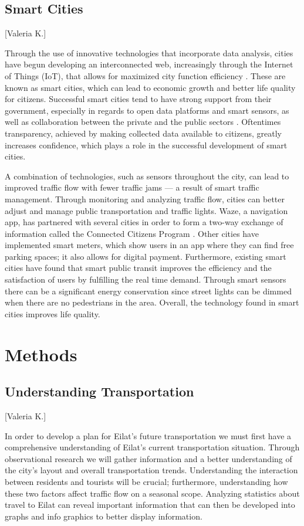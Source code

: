 \documentclass[12pt]{article}                         %
\begin{document}
\subsection{Smart Cities}[Valeria K.]

Through the use of innovative technologies that incorporate data analysis, cities have begun developing an interconnected web, increasingly through the Internet of Things (IoT), that allows for maximized city function efficiency \cite{MargaretRouseSmartCity}. These are known as smart cities, which can lead to economic growth and better life quality for citizens. Successful smart cities tend to have strong support from their government, especially in regards to open data platforms and smart sensors, as well as collaboration between the private and the public sectors \cite{BrianZanghi2017WhyExamples}. Oftentimes transparency, achieved by making collected data available to citizens, greatly increases confidence, which plays a role in the successful development of smart cities.

A combination of technologies, such as sensors throughout the city, can lead to improved traffic flow with fewer traffic jams --- a result of smart traffic management. Through monitoring and analyzing traffic flow, cities can better adjust and manage public transportation and traffic lights. Waze, a navigation app, has partnered with several cities in order to form a two-way exchange of information called the Connected Citizens Program \cite{Stern2016WazeMobility}. Other cities have implemented smart meters, which show users in an app where they can find free parking spaces; it also allows for digital payment. Furthermore, existing smart cities have found that smart public transit improves the efficiency and the satisfaction of users by fulfilling the real time demand. Through smart sensors there can be a significant energy conservation since street lights can be dimmed when there are no pedestrians in the area. Overall, the technology found in smart cities improves life quality.

\newpage
\section{Methods}

\subsection{Understanding Transportation}[Valeria K.]

In order to develop a plan for Eilat's future transportation we must first have a comprehensive understanding of Eilat's current transportation situation. Through observational research we will gather information and a better understanding of the city's layout and overall transportation trends. Understanding the interaction between residents and tourists will be crucial; furthermore, understanding how these two factors affect traffic flow on a seasonal scope. Analyzing statistics about travel to Eilat can reveal important information that can then be developed into graphs and info graphics to better display information.
\end{document}
